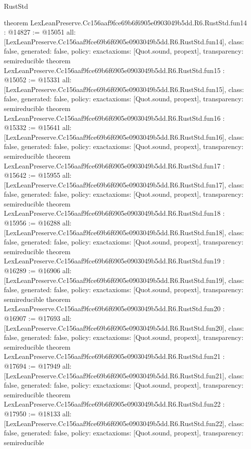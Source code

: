 \begin{lexlean}{RustStd}
\begin{coremodule}
{}
theorem LexLeanPreserve.Cc156aaf9fce69b6f6905e0903049b5dd.R6.RustStd.fun14 : @14827 := @15051 {
  all: [LexLeanPreserve.Cc156aaf9fce69b6f6905e0903049b5dd.R6.RustStd.fun14],
  class: false,
  generated: false,
  policy: exact{axioms: [Quot.sound, propext]},
  transparency: semireducible
}
theorem LexLeanPreserve.Cc156aaf9fce69b6f6905e0903049b5dd.R6.RustStd.fun15 : @15052 := @15331 {
  all: [LexLeanPreserve.Cc156aaf9fce69b6f6905e0903049b5dd.R6.RustStd.fun15],
  class: false,
  generated: false,
  policy: exact{axioms: [Quot.sound, propext]},
  transparency: semireducible
}
theorem LexLeanPreserve.Cc156aaf9fce69b6f6905e0903049b5dd.R6.RustStd.fun16 : @15332 := @15641 {
  all: [LexLeanPreserve.Cc156aaf9fce69b6f6905e0903049b5dd.R6.RustStd.fun16],
  class: false,
  generated: false,
  policy: exact{axioms: [Quot.sound, propext]},
  transparency: semireducible
}
theorem LexLeanPreserve.Cc156aaf9fce69b6f6905e0903049b5dd.R6.RustStd.fun17 : @15642 := @15955 {
  all: [LexLeanPreserve.Cc156aaf9fce69b6f6905e0903049b5dd.R6.RustStd.fun17],
  class: false,
  generated: false,
  policy: exact{axioms: [Quot.sound, propext]},
  transparency: semireducible
}
theorem LexLeanPreserve.Cc156aaf9fce69b6f6905e0903049b5dd.R6.RustStd.fun18 : @15956 := @16288 {
  all: [LexLeanPreserve.Cc156aaf9fce69b6f6905e0903049b5dd.R6.RustStd.fun18],
  class: false,
  generated: false,
  policy: exact{axioms: [Quot.sound, propext]},
  transparency: semireducible
}
theorem LexLeanPreserve.Cc156aaf9fce69b6f6905e0903049b5dd.R6.RustStd.fun19 : @16289 := @16906 {
  all: [LexLeanPreserve.Cc156aaf9fce69b6f6905e0903049b5dd.R6.RustStd.fun19],
  class: false,
  generated: false,
  policy: exact{axioms: [Quot.sound, propext]},
  transparency: semireducible
}
theorem LexLeanPreserve.Cc156aaf9fce69b6f6905e0903049b5dd.R6.RustStd.fun20 : @16907 := @17693 {
  all: [LexLeanPreserve.Cc156aaf9fce69b6f6905e0903049b5dd.R6.RustStd.fun20],
  class: false,
  generated: false,
  policy: exact{axioms: [Quot.sound, propext]},
  transparency: semireducible
}
theorem LexLeanPreserve.Cc156aaf9fce69b6f6905e0903049b5dd.R6.RustStd.fun21 : @17694 := @17949 {
  all: [LexLeanPreserve.Cc156aaf9fce69b6f6905e0903049b5dd.R6.RustStd.fun21],
  class: false,
  generated: false,
  policy: exact{axioms: [Quot.sound, propext]},
  transparency: semireducible
}
theorem LexLeanPreserve.Cc156aaf9fce69b6f6905e0903049b5dd.R6.RustStd.fun22 : @17950 := @18133 {
  all: [LexLeanPreserve.Cc156aaf9fce69b6f6905e0903049b5dd.R6.RustStd.fun22],
  class: false,
  generated: false,
  policy: exact{axioms: [Quot.sound, propext]},
  transparency: semireducible
}
\end{coremodule}
\end{lexlean}
